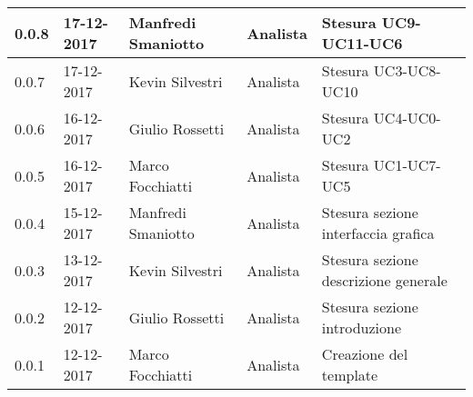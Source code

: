 \documentclass[./AnalisideiRequisiti.tex]{subfiles}
\begin{document}
{\begin{longtable}{|p{20mm}|p{20mm}|p{40mm}|p{30mm}|p{50mm}|}
		0.0.8 & 17-12-2017 & Manfredi Smaniotto & Analista & Stesura UC9-UC11-UC6\\ \hline
		0.0.7 & 17-12-2017 & Kevin Silvestri & Analista & Stesura UC3-UC8-UC10\\ \hline
		0.0.6 & 16-12-2017 & Giulio Rossetti & Analista & Stesura UC4-UC0-UC2\\ \hline
		0.0.5 & 16-12-2017 & Marco Focchiatti & Analista & Stesura UC1-UC7-UC5\\ \hline
		0.0.4 & 15-12-2017 & Manfredi Smaniotto & Analista & Stesura sezione interfaccia grafica\\ \hline
		0.0.3 & 13-12-2017 & Kevin Silvestri & Analista & Stesura sezione descrizione generale\\ \hline
		0.0.2 & 12-12-2017 & Giulio Rossetti & Analista & Stesura sezione introduzione\\ \hline
		0.0.1 & 12-12-2017 & Marco Focchiatti & Analista & Creazione del template\\ \hline
	\end{longtable}


}	
\end{document}
